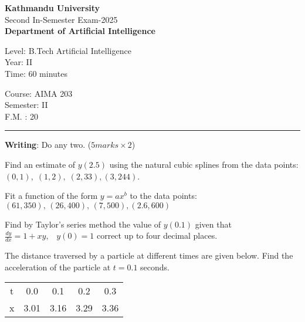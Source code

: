 \documentclass[12pt]{exam}
\begin{document}
\begin{center}
 {\bfseries  { Kathmandu University}} \\[-1mm]
 Second In-Semester Exam-2025\\[-2mm]
 {\small \textbf{Department of Artificial Intelligence}}
\end{center}
\begin{minipage}{0.70\linewidth}
  \small
  \begin{flushleft}
    Level: B.Tech Artificial Intelligence \\
    Year: II \\
    Time: 60 minutes
  \end{flushleft}
\end{minipage} \hfill
\begin{minipage}{0.25\linewidth}
  \begin{flushleft}
    Course: AIMA 203 \\
    Semester: II \\
    F.M. : 20
  \end{flushleft}
\end{minipage}
\vskip 1mm
\rule{\textwidth}{1pt}
 \begin{center}
    \textbf{Writing}: Do any two. ($5 marks \times 2$)
  \end{center}
\begin{questions}

  \question Find an estimate of $y(2.5)$ using the natural cubic splines from the data points: $(0,1), \; (1,2), \; (2,33), (3,244)$.

  \question Fit a function of the form $y=ax^b$ to the data points: \\ $(61,350), \, (26,400), \, (7,500), (2.6,600)$


  \question Find by Taylor's series method the value of $y(0.1)$ given that $\displaystyle \frac{dy}{dx} = 1 + xy, \;\;\; y(0)=1$ correct up to four decimal places.


 \question The distance traversed by a particle at different times are given below. Find the acceleration of the particle at $t=0.1$ seconds.
  \begin{table}[h]
    \centering
    \begin{tabular}{|c|c|c|c|c|}
      \hline
      t& 0.0& 0.1& 0.2& 0.3\\
      x & 3.01 & 3.16& 3.29& 3.36\\
      \hline
    \end{tabular}
  \end{table}
\end{questions}
\end{document}
